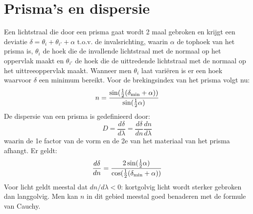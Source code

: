 \documentclass[twoside]{report}
\begin{document}
\section{Prisma's en dispersie}
Een lichtstraal die door een prisma gaat wordt 2 maal gebroken en krijgt een
deviatie $\delta=\theta_i+\theta_{i'}+\alpha$ t.o.v. de invalsrichting,
waarin $\alpha$ de tophoek van het prisma is, $\theta_i$ de hoek die de
invallende lichtstraal met de normaal op het oppervlak maakt en $\theta_{i'}$
de hoek die de uittredende lichtstraal met de normaal op het uittreeoppervlak
maakt. Wanneer men $\theta_i$ laat vari\"eren is er een hoek waarvoor $\delta$
een minimum bereikt. Voor de brekingsindex van het prisma volgt nu:
\[
n=\frac{\sin(\mbox{$\frac{1}{2}$}(\delta_{\rm min}+\alpha))}{\sin(\mbox{$\frac{1}{2}$}\alpha)}
\]
De dispersie van een prisma is gedefinieerd door:
\[
D=\frac{d\delta}{d\lambda}=\frac{d\delta}{dn}\frac{dn}{d\lambda}
\]
waarin de 1e factor van de vorm en de 2e van het materiaal van het prisma
afhangt. Er geldt:
\[
\frac{d\delta}{dn}=\frac{2\sin(\mbox{$\frac{1}{2}$}\alpha)}{\cos(\mbox{$\frac{1}{2}$}(\delta_{\rm min}+\alpha))}
\]
Voor licht geldt meestal dat $dn/d\lambda<0$: kortgolvig licht wordt sterker
gebroken dan langgolvig. Men kan $n$ in dit gebied meestal goed benaderen met
de formule van Cauchy.
\end{document}
